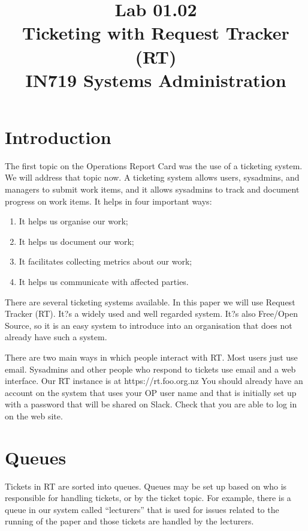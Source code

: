 \documentclass{article}
\begin{document}
\title{Lab 01.02\\Ticketing with Request Tracker (RT)\\IN719 Systems Administration}
\date{}
\maketitle

\section{Introduction}
The first topic on the Operations Report Card was the use of a ticketing system. We will address that topic now. A ticketing system allows users, sysadmins, and managers to submit work items, and it allows sysadmins to track and document progress on work items. It helps in four important ways:

\begin{enumerate}
\item It helps us organise our work;
\item It helps us document our work;
\item It facilitates collecting metrics about our work;
\item It helps us communicate with affected parties.
\end{enumerate}

There are several ticketing systems available. In this paper we will use Request Tracker (RT). It?s a widely used and well regarded system. It?s also Free/Open Source, so it is an easy system to introduce into an organisation that does not already have such a system.

There are two main ways in which people interact with RT. Most users just use email. Sysadmins and other people who respond to tickets use email and a web interface. Our RT instance is at https://rt.foo.org.nz You should already have an account on the system that uses your OP user name and that is initially set up with a password that will be shared on Slack. Check that you are able to log in on the web site.

\section{Queues}
Tickets in RT are sorted into queues. Queues may be set up based on who is responsible for handling tickets, or by the ticket topic. For example, there is a queue in our system called ``lecturers'' that is used for issues related to the running of the paper and those tickets are handled by the lecturers.
\end{document}
